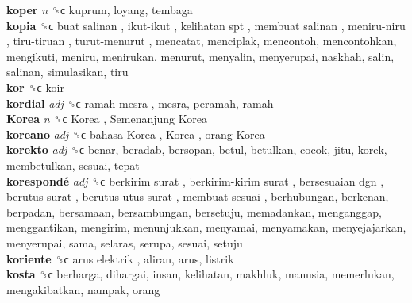 \textbf{koper} \emph{n}  ␝ϲ  kuprum, loyang, tembaga  \\
\textbf{kopia} ␝ϲ   buat salinan ,  ikut-ikut ,  kelihatan spt ,  membuat salinan ,  meniru-niru ,  tiru-tiruan ,  turut-menurut , mencatat, menciplak, mencontoh, mencontohkan, mengikuti, meniru, menirukan, menurut, menyalin, menyerupai, naskhah, salin, salinan, simulasikan, tiru  \\
\textbf{kor} ␝ϲ  koir  \\
\textbf{kordial} \emph{adj}  ␝ϲ   ramah mesra , mesra, peramah, ramah  \\
\textbf{Korea} \emph{n}  ␝ϲ   Korea ,  Semenanjung Korea   \\
\textbf{koreano} \emph{adj}  ␝ϲ   bahasa Korea ,  Korea ,  orang Korea   \\
\textbf{korekto} \emph{adj}  ␝ϲ  benar, beradab, bersopan, betul, betulkan, cocok, jitu, korek, membetulkan, sesuai, tepat  \\
\textbf{korespondé} \emph{adj}  ␝ϲ   berkirim surat ,  berkirim-kirim surat ,  bersesuaian dgn ,  berutus surat ,  berutus-utus surat ,  membuat sesuai , berhubungan, berkenan, berpadan, bersamaan, bersambungan, bersetuju, memadankan, menganggap, menggantikan, mengirim, menunjukkan, menyamai, menyamakan, menyejajarkan, menyerupai, sama, selaras, serupa, sesuai, setuju  \\
\textbf{koriente} ␝ϲ   arus elektrik , aliran, arus, listrik  \\
\textbf{kosta} ␝ϲ  berharga, dihargai, insan, kelihatan, makhluk, manusia, memerlukan, mengakibatkan, nampak, orang  \\
